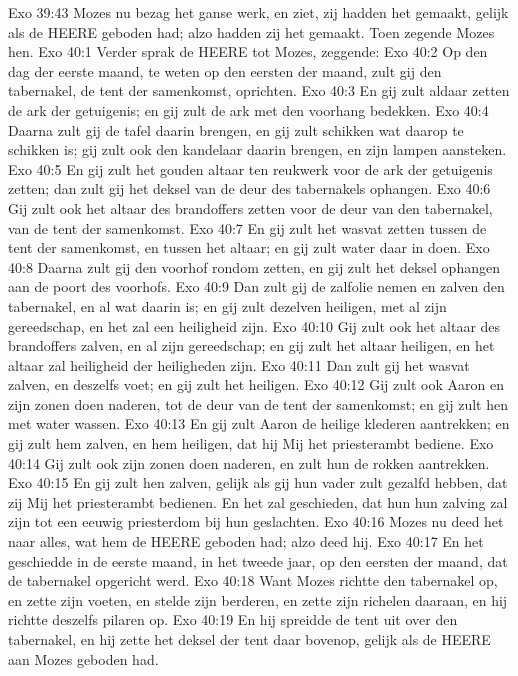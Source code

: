 Exo 39:43  Mozes nu bezag het ganse werk, en ziet, zij hadden het gemaakt, gelijk als de HEERE geboden had; alzo hadden zij het gemaakt. Toen zegende Mozes hen.
Exo 40:1  Verder sprak de HEERE tot Mozes, zeggende:
Exo 40:2  Op den dag der eerste maand, te weten op den eersten der maand, zult gij den tabernakel, de tent der samenkomst, oprichten.
Exo 40:3  En gij zult aldaar zetten de ark der getuigenis; en gij zult de ark met den voorhang bedekken.
Exo 40:4  Daarna zult gij de tafel daarin brengen, en gij zult schikken wat daarop te schikken is; gij zult ook den kandelaar daarin brengen, en zijn lampen aansteken.
Exo 40:5  En gij zult het gouden altaar ten reukwerk voor de ark der getuigenis zetten; dan zult gij het deksel van de deur des tabernakels ophangen.
Exo 40:6  Gij zult ook het altaar des brandoffers zetten voor de deur van den tabernakel, van de tent der samenkomst.
Exo 40:7  En gij zult het wasvat zetten tussen de tent der samenkomst, en tussen het altaar; en gij zult water daar in doen.
Exo 40:8  Daarna zult gij den voorhof rondom zetten, en gij zult het deksel ophangen aan de poort des voorhofs.
Exo 40:9  Dan zult gij de zalfolie nemen en zalven den tabernakel, en al wat daarin is; en gij zult dezelven heiligen, met al zijn gereedschap, en het zal een heiligheid zijn.
Exo 40:10  Gij zult ook het altaar des brandoffers zalven, en al zijn gereedschap; en gij zult het altaar heiligen, en het altaar zal heiligheid der heiligheden zijn.
Exo 40:11  Dan zult gij het wasvat zalven, en deszelfs voet; en gij zult het heiligen.
Exo 40:12  Gij zult ook Aaron en zijn zonen doen naderen, tot de deur van de tent der samenkomst; en gij zult hen met water wassen.
Exo 40:13  En gij zult Aaron de heilige klederen aantrekken; en gij zult hem zalven, en hem heiligen, dat hij Mij het priesterambt bediene.
Exo 40:14  Gij zult ook zijn zonen doen naderen, en zult hun de rokken aantrekken.
Exo 40:15  En gij zult hen zalven, gelijk als gij hun vader zult gezalfd hebben, dat zij Mij het priesterambt bedienen. En het zal geschieden, dat hun hun zalving zal zijn tot een eeuwig priesterdom bij hun geslachten.
Exo 40:16  Mozes nu deed het naar alles, wat hem de HEERE geboden had; alzo deed hij.
Exo 40:17  En het geschiedde in de eerste maand, in het tweede jaar, op den eersten der maand, dat de tabernakel opgericht werd.
Exo 40:18  Want Mozes richtte den tabernakel op, en zette zijn voeten, en stelde zijn berderen, en zette zijn richelen daaraan, en hij richtte deszelfs pilaren op.
Exo 40:19  En hij spreidde de tent uit over den tabernakel, en hij zette het deksel der tent daar bovenop, gelijk als de HEERE aan Mozes geboden had.
